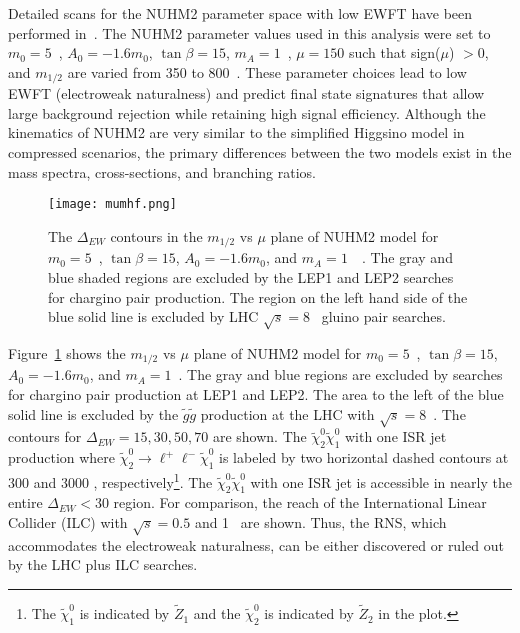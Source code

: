 Detailed scans for the NUHM2 parameter space with low EWFT have been performed in~\cite{Baer:2013xua}.
The NUHM2 parameter values used in this analysis were set to $m_{0} = 5$~{\TeV}, $A_{0} = -1.6 m_{0}$, $\tan\beta = 15$, $m_{A} = 1$~{\TeV}, $\mu = 150$ such that sign($\mu$) $> 0$, and $m_{1/2}$ are varied from 350 to 800~{\GeV}.
These parameter choices lead to low EWFT (electroweak naturalness) and predict final state signatures that allow large background rejection while retaining high signal efficiency.
Although the kinematics of NUHM2 are very similar to the simplified Higgsino model in compressed scenarios, the primary differences between the two models exist in the mass spectra, cross-sections, and branching ratios.

\begin{figure}[htb]
    \begin{center}
        \texttt{[image: mumhf.png]}
        \caption{The $\Delta_{EW}$ contours in the $m_{1/2}$ vs $\mu$ plane of NUHM2 model for $m_{0} =  5$~{\GeV}, $\tan\beta = 15$, $A_{0} = -1.6 m_{0}$, and $m_{A} = 1$~{\TeV}~\cite{Baer:2016usl}.
        The gray and blue shaded regions are excluded by the LEP1 and LEP2 searches for chargino pair production.
        The region on the left hand side of the blue solid line is excluded by LHC $\sqrt{s} = 8$~{\TeV} gluino pair searches.}
        \label{fig:susy_mumhf}
    \end{center}
\end{figure}

Figure~\ref{fig:susy_mumhf} shows the $m_{1/2}$ vs $\mu$ plane of NUHM2 model for $m_{0} =  5$~{\GeV}, $\tan\beta = 15$, $A_{0} = -1.6 m_{0}$, and $m_{A} = 1$~{\TeV}.
The gray and blue regions are excluded by searches for chargino pair production at LEP1 and LEP2.
The area to the left of the blue solid line is excluded by the $\widetilde{g} \widetilde{g}$ production at the LHC with $\sqrt{s} = 8$~{\TeV}.
The contours for $\Delta_{EW} = 15, 30, 50, 70$ are shown.
The $\widetilde{\chi}^{0}_{2} \widetilde{\chi}^{0}_{1}$ with one ISR jet production where $\widetilde{\chi}^{0}_{2} \to \ell^{+} \ell^{-} \widetilde{\chi}^{0}_{1}$ is labeled by two horizontal dashed contours at 300 \ifb and 3000 \ifb, respectively\footnote{The $\widetilde{\chi}^{0}_{1}$ is indicated by $\widetilde{Z}_{1}$ and the $\widetilde{\chi}^{0}_{2}$ is indicated by $\widetilde{Z}_{2}$ in the plot.}.
The $\widetilde{\chi}^{0}_{2} \widetilde{\chi}^{0}_{1}$ with one ISR jet is accessible in nearly the entire $\Delta_{EW} < 30$ region.
For comparison, the reach of the International Linear Collider (ILC) with $\sqrt{s} = 0.5$ and 1~{\TeV} are shown.
Thus, the RNS, which accommodates the electroweak naturalness, can be either discovered or ruled out by the LHC plus ILC searches.
